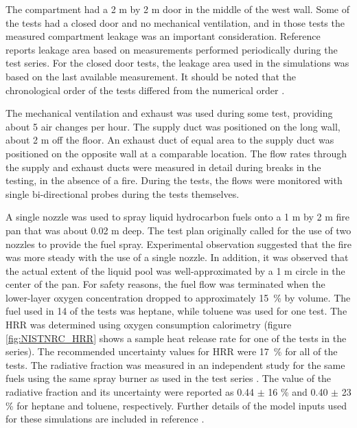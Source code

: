 The compartment had a 2 m by 2 m door in the middle of the west wall. Some of the tests had a closed door and no mechanical ventilation, and in those tests the measured compartment leakage was an important consideration. Reference \cite{Hamins:2005} reports leakage area based on measurements performed periodically during the test series. For the closed door tests, the leakage area used in the simulations was based on the last available measurement. It should be noted that the chronological order of the tests differed from the numerical order \cite{Hamins:2005}. 

The mechanical ventilation and exhaust was used during some test, providing about 5 air changes per hour. The supply duct was positioned on the long wall, about 2 m off the floor. An exhaust duct of equal area to the supply duct was positioned on the opposite wall at a comparable location. The flow rates through the supply and exhaust ducts were measured in detail during breaks in the testing, in the absence of a fire. During the tests, the flows were monitored with single bi-directional probes during the tests themselves.

A single nozzle was used to spray liquid hydrocarbon fuels onto a 1 m by 2 m fire pan that was about 0.02 m deep. The test plan originally called for the use of two nozzles to provide the fuel spray. Experimental observation suggested that the fire was more steady with the use of a single nozzle. In addition, it was observed that the actual extent of the liquid pool was well-approximated by a 1 m circle in the center of the pan. For safety reasons, the fuel flow was terminated when the lower-layer oxygen concentration dropped to approximately 15~\% by volume. The fuel used in 14 of the tests was heptane, while toluene was used for one test. The HRR was determined using oxygen consumption calorimetry (figure \ref{fig:NISTNRC_HRR} shows a sample heat release rate for one of the tests in the series). The recommended uncertainty values for HRR were 17~\% for all of the tests. The radiative fraction was measured in an independent study for the same fuels using the same spray burner as used in the test series \cite{Hamins:2003}. The value of the radiative fraction and its uncertainty were reported as 0.44 $\pm$ 16 \% and 0.40 $\pm$ 23 \% for heptane and toluene, respectively. Further details of the model inputs used for these simulations are included in reference \cite{NRCNUREG1824Experimental}.

